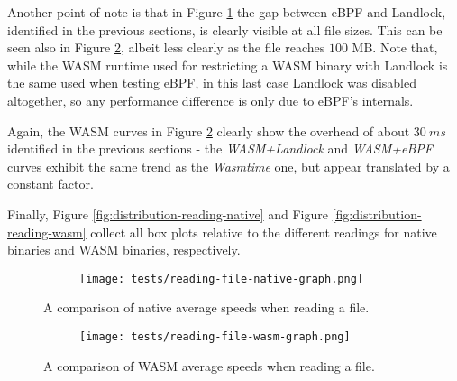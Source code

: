 Another point of note is that in Figure \ref{fig:avg-comparison-native-speed} the gap between eBPF and Landlock,
identified in the previous sections, is clearly visible at all file sizes.
This can be seen also in Figure \ref{fig:avg-comparison-wasm-speed}, albeit less clearly as the file reaches $100$ MB.
Note that, while the WASM runtime used for restricting a WASM binary with Landlock is the same used when testing eBPF,
in this last case Landlock was disabled altogether, so any performance difference is only due to eBPF's internals.

Again, the WASM curves in Figure \ref{fig:avg-comparison-wasm-speed} clearly show the overhead
of about $30\ ms$ identified in the previous sections - the \textit{WASM+Landlock} and \textit{WASM+eBPF} curves
exhibit the same trend as the \textit{Wasmtime} one, but appear translated by a constant factor.

Finally, Figure \ref{fig:distribution-reading-native} and Figure \ref{fig:distribution-reading-wasm}
collect all box plots relative to the different readings for native binaries and WASM binaries, respectively.

\begin{figure}[ht!]
  \centering
  \begin{subfigure}[b]{0.78\textwidth}
    \centering
    \texttt{[image: tests/reading-file-native-graph.png]}
  \end{subfigure}

  \caption{A comparison of native average speeds when reading a file.}
  \label{fig:avg-comparison-native-speed}
\end{figure}

\begin{figure}[ht!]
  \centering
  \begin{subfigure}[b]{0.78\textwidth}
    \centering
    \texttt{[image: tests/reading-file-wasm-graph.png]}
  \end{subfigure}

  \caption{A comparison of WASM average speeds when reading a file.}
  \label{fig:avg-comparison-wasm-speed}
\end{figure}

